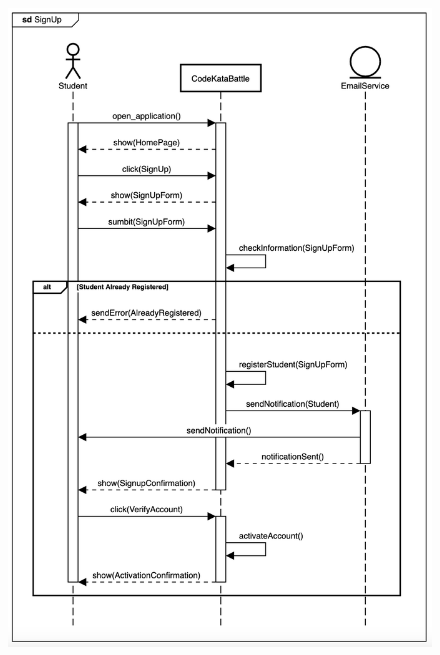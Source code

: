 \documentclass{article}
\begin{document}
\begin{figure}[H]
    \centering
    \includegraphics[scale = 0.45]{figures/UseCasesSD/StudentSignUpSeqDiagram.png}\\
\end{figure}
\end{document}
